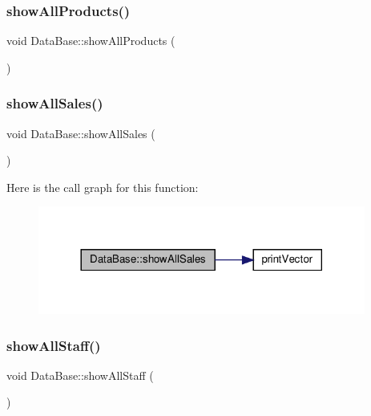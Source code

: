\subsubsection{\texorpdfstring{show\+All\+Products()}{showAllProducts()}}
{\footnotesize\ttfamily void Data\+Base\+::show\+All\+Products (\begin{DoxyParamCaption}{ }\end{DoxyParamCaption})}

\mbox{\label{classDataBase_abf8a64bd81ce3207862b0105d52f646f}} 
\subsubsection{\texorpdfstring{show\+All\+Sales()}{showAllSales()}}
{\footnotesize\ttfamily void Data\+Base\+::show\+All\+Sales (\begin{DoxyParamCaption}{ }\end{DoxyParamCaption})}

Here is the call graph for this function\+:\nopagebreak
\begin{figure}[H]
\begin{center}
\leavevmode
\includegraphics[width=305pt]{classDataBase_abf8a64bd81ce3207862b0105d52f646f_cgraph}
\end{center}
\end{figure}
\mbox{\label{classDataBase_aa1d2ae05f581ec45eb8da06e468aec30}} 
\subsubsection{\texorpdfstring{show\+All\+Staff()}{showAllStaff()}}
{\footnotesize\ttfamily void Data\+Base\+::show\+All\+Staff (\begin{DoxyParamCaption}{ }\end{DoxyParamCaption})}

